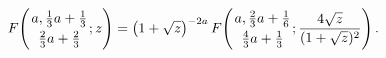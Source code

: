 \[\mathop{F\/}\nolimits\!\left({a,\tfrac{1}{3}a+\tfrac{1}{3}\atop\tfrac{2}{3}a+%
\tfrac{2}{3}};z\right)=\left(1+\sqrt{z}\right)^{-2a}\*\mathop{F\/}\nolimits\!%
\left({a,\tfrac{2}{3}a+\tfrac{1}{6}\atop\tfrac{4}{3}a+\tfrac{1}{3}};\frac{4%
\sqrt{z}}{(1+\sqrt{z})^{2}}\right).\]